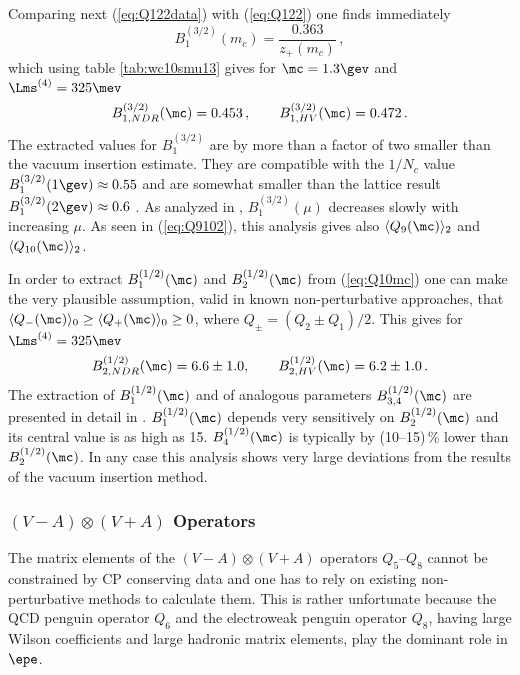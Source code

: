 Comparing next (\ref{eq:Q122data})  with (\ref{eq:Q122}) one 
finds immediately
\begin{equation}
B_1^{(3/2)}(m_c) = \frac{0.363}{z_+(m_c)}\,,
\label{eq:B321}
\end{equation}
which using table \ref{tab:wc10smu13} gives for $\mc=1.3\gev$ and 
$\Lms^{(4)}=325\mev$
\begin{equation}
B_{1,NDR}^{(3/2)}(\mc) =  0.453\,,
\qquad
B_{1,HV}^{(3/2)}(\mc) =  0.472 \, .
\label{eq:B321mc}
\end{equation}
The extracted values for $B_1^{(3/2)}$ are by more than a factor of two
smaller than the vacuum insertion estimate.
They are compatible with the $1/N_c$ value $B_1^{(3/2)}(1\gev) \approx
0.55$ \cite{bardeen:87} and are somewhat smaller than the lattice result
$B_1^{(3/2)}(2\gev) \approx 0.6$ \cite{ciuchini:95}.
As analyzed in \cite{BJLW},
$B_1^{(3/2)}(\mu)$ decreases slowly with increasing $\mu$.
As seen in (\ref{eq:Q9102}), this analysis gives also
$\langle Q_9(\mc) \rangle_2$ and $\langle Q_{10}(\mc) \rangle_2$.

In order to extract $B_1^{(1/2)}(\mc)$ and $B_2^{(1/2)}(\mc)$ from
(\ref{eq:Q10mc})
one can make the very plausible assumption,
valid in known non-perturbative approaches, that
 $\langle Q_-(\mc) \rangle_0 \ge
\langle Q_+(\mc) \rangle_0 \ge 0$, where $Q_\pm=(Q_2\pm Q_1)/2$.
This gives  for $\Lms^{(4)}=325\mev$
\begin{equation}
B_{2,NDR}^{(1/2)}(\mc) =  6.6 \pm 1.0,
\qquad
B_{2,HV}^{(1/2)}(\mc) =  6.2 \pm 1.0 \, .
\label{eq:B122mc}
\end{equation}
The extraction of $B_1^{(1/2)}(\mc)$ and of analogous parameters
$B_{3,4}^{(1/2)}(\mc)$ are presented in detail in \cite{BJLW}.
$B_1^{(1/2)}(\mc)$ depends very sensitively on $B_2^{(1/2)}(\mc)$ and
its central value is as high as 15. $B_4^{(1/2)}(\mc)$ is 
typically by (10--15)\,\% lower than $B_2^{(1/2)}(\mc)$. In any case
this analysis shows very large deviations from the results of the
vacuum insertion method.

\subsubsection{$(V-A) \otimes (V+A)$ Operators}
The matrix elements of the $(V-A) \otimes (V+A)$ operators $Q_5$--$Q_8$
cannot be constrained by CP conserving data and one has to rely on
existing non-perturbative methods to calculate them. 
This is rather unfortunate because the QCD penguin operator $Q_6$
and the electroweak penguin operator $Q_8$, having large Wilson
coefficients and large hadronic matrix elements, play the dominant
role in $\epe$. 

